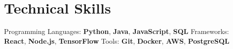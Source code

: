 \documentclass[11pt]{resumes}
\begin{document}
\section{Technical Skills}
\begin{itemize}[leftmargin=0.15in, label={}]
\small{\item{
Programming Languages: \textbf{Python}, \textbf{Java}, \textbf{JavaScript}, \textbf{SQL}
Frameworks: \textbf{React}, \textbf{Node.js}, \textbf{TensorFlow}
Tools: \textbf{Git}, \textbf{Docker}, \textbf{AWS}, \textbf{PostgreSQL}
}}
\end{itemize}
\end{document}
